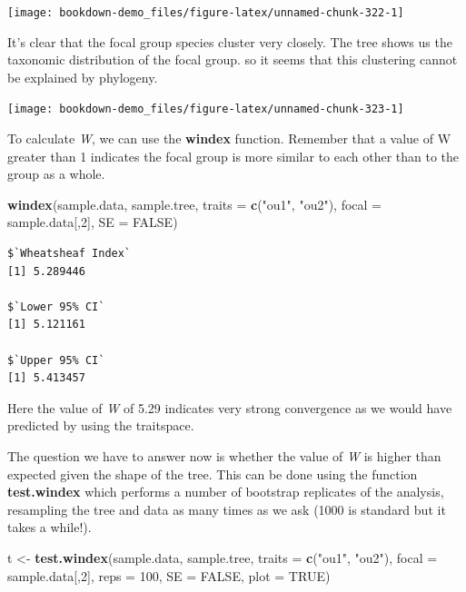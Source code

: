 \documentclass[
]{book}
\newenvironment{Shaded}{\begin{snugshade}}{\end{snugshade}}
\newcommand{\DataTypeTok}[1]{\textcolor[rgb]{0.13,0.29,0.53}{#1}}
\newcommand{\DecValTok}[1]{\textcolor[rgb]{0.00,0.00,0.81}{#1}}
\newcommand{\KeywordTok}[1]{\textcolor[rgb]{0.13,0.29,0.53}{\textbf{#1}}}
\newcommand{\NormalTok}[1]{#1}
\newcommand{\OtherTok}[1]{\textcolor[rgb]{0.56,0.35,0.01}{#1}}
\newcommand{\StringTok}[1]{\textcolor[rgb]{0.31,0.60,0.02}{#1}}
\begin{document}
\begin{center}\texttt{[image: bookdown-demo\_files/figure-latex/unnamed-chunk-322-1]} \end{center}

It's clear that the focal group species cluster very closely. The tree shows us the taxonomic distribution of the focal group. so it seems that this clustering cannot be explained by phylogeny.

\begin{center}\texttt{[image: bookdown-demo\_files/figure-latex/unnamed-chunk-323-1]} \end{center}

To calculate \emph{W}, we can use the \textbf{windex} function. Remember that a value of W greater than 1 indicates the focal group is more similar to each other than to the group as a whole.

\begin{Shaded}
\begin{Highlighting}[]
\KeywordTok{windex}\NormalTok{(sample.data, sample.tree,}
       \DataTypeTok{traits =} \KeywordTok{c}\NormalTok{(}\StringTok{"ou1"}\NormalTok{, }\StringTok{"ou2"}\NormalTok{),}
       \DataTypeTok{focal =}\NormalTok{ sample.data[,}\DecValTok{2}\NormalTok{],}
       \DataTypeTok{SE =} \OtherTok{FALSE}\NormalTok{)}
\end{Highlighting}
\end{Shaded}

\begin{verbatim}
$`Wheatsheaf Index`
[1] 5.289446

$`Lower 95% CI`
[1] 5.121161

$`Upper 95% CI`
[1] 5.413457
\end{verbatim}

Here the value of \emph{W} of 5.29 indicates very strong convergence as we would have predicted by using the traitspace.

The question we have to answer now is whether the value of \emph{W} is higher than expected given the shape of the tree. This can be done using the function \textbf{test.windex} which performs a number of bootstrap replicates of the analysis, resampling the tree and data as many times as we ask (1000 is standard but it takes a while!).

\begin{Shaded}
\begin{Highlighting}[]
\NormalTok{t \textless{}{-}}\StringTok{ }\KeywordTok{test.windex}\NormalTok{(sample.data, sample.tree,}
       \DataTypeTok{traits =} \KeywordTok{c}\NormalTok{(}\StringTok{"ou1"}\NormalTok{, }\StringTok{"ou2"}\NormalTok{),}
       \DataTypeTok{focal =}\NormalTok{ sample.data[,}\DecValTok{2}\NormalTok{], }\DataTypeTok{reps =} \DecValTok{100}\NormalTok{,}
       \DataTypeTok{SE =} \OtherTok{FALSE}\NormalTok{, }\DataTypeTok{plot =} \OtherTok{TRUE}\NormalTok{)}
\end{Highlighting}
\end{Shaded}
\end{document}
